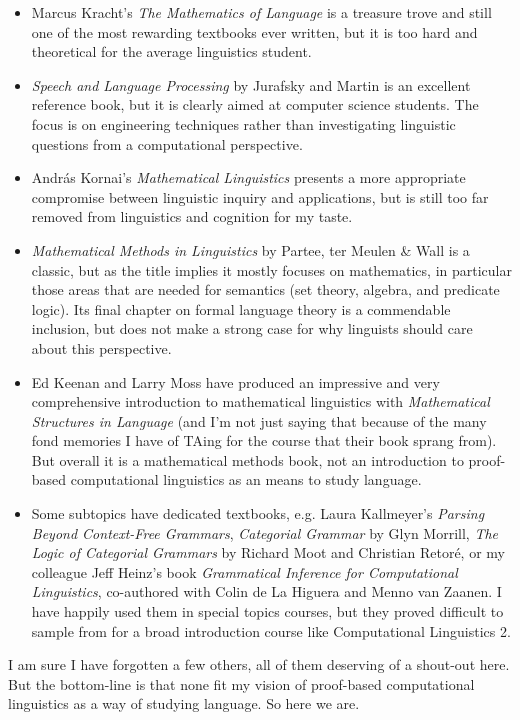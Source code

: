 \begin{itemize}
    \item Marcus Kracht's \emph{The Mathematics of Language} is a treasure trove and still one of the most rewarding textbooks ever written, but it is too hard and theoretical for the average linguistics student.
    \item \emph{Speech and Language Processing} by Jurafsky and Martin is an excellent reference book, but it is clearly aimed at computer science students.
          The focus is on engineering techniques rather than investigating linguistic questions from a computational perspective.
    \item András Kornai's \emph{Mathematical Linguistics} presents a more appropriate compromise between linguistic inquiry and applications, but is still too far removed from linguistics and cognition for my taste.
    \item \emph{Mathematical Methods in Linguistics} by Partee, ter Meulen \& Wall is a classic, but as the title implies it mostly focuses on mathematics, in particular those areas that are needed for semantics (set theory, algebra, and predicate logic).
          Its final chapter on formal language theory is a commendable inclusion, but does not make a strong case for why linguists should care about this perspective.
    \item Ed Keenan and Larry Moss have produced an impressive and very comprehensive introduction to mathematical linguistics with \emph{Mathematical Structures in Language} (and I'm not just saying that because of the many fond memories I have of TAing for the course that their book sprang from).
          But overall it is a mathematical methods book, not an introduction to proof-based computational linguistics as an means to study language. 
    \item Some subtopics have dedicated textbooks, e.g. Laura Kallmeyer's \emph{Parsing Beyond Context-Free Grammars}, \emph{Categorial Grammar} by Glyn Morrill, \emph{The Logic of Categorial Grammars} by Richard Moot and Christian Retoré, or my colleague Jeff Heinz's book \emph{Grammatical Inference for Computational Linguistics}, co-authored with Colin de La Higuera and Menno van Zaanen.
          I have happily used them in special topics courses, but they proved difficult to sample from for a broad introduction course like Computational Linguistics 2. 
\end{itemize}

I am sure I have forgotten a few others, all of them deserving of a shout-out here.
But the bottom-line is that none fit my vision of proof-based computational linguistics as a way of studying language.
So here we are.


